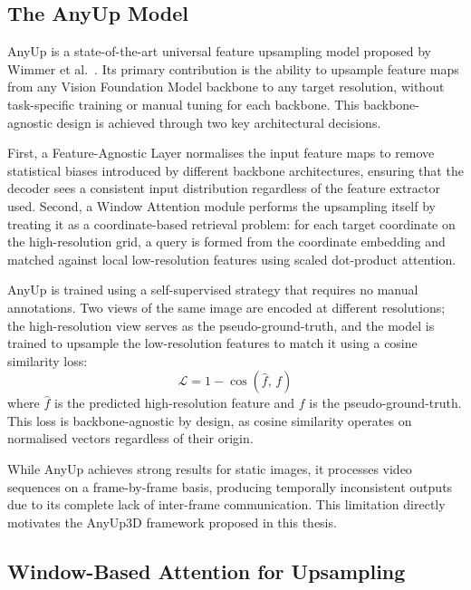 \subsection{The AnyUp Model}
\label{sec:anyup2d}

AnyUp is a state-of-the-art universal feature upsampling model
proposed by Wimmer et al.\ \cite{anyup}.
Its primary contribution is the ability to upsample feature maps
from any Vision Foundation Model backbone to any target
resolution, without task-specific training or manual tuning for
each backbone.
This backbone-agnostic design is achieved through two key
architectural decisions.

First, a Feature-Agnostic Layer normalises the input feature
maps to remove statistical biases introduced by different
backbone architectures, ensuring that the decoder sees a
consistent input distribution regardless of the feature
extractor used.
Second, a Window Attention module performs the upsampling itself
by treating it as a coordinate-based retrieval problem: for each
target coordinate on the high-resolution grid, a query is formed
from the coordinate embedding and matched against local
low-resolution features using scaled dot-product attention.

AnyUp is trained using a self-supervised strategy that requires
no manual annotations.
Two views of the same image are encoded at different
resolutions; the high-resolution view serves as the
pseudo-ground-truth, and the model is trained to upsample the
low-resolution features to match it using a cosine similarity
loss:
\begin{equation}
  \mathcal{L} = 1 - \cos(\hat{f},\, f)
  \label{eq:anyup_loss}
\end{equation}
where $\hat{f}$ is the predicted high-resolution feature and $f$
is the pseudo-ground-truth.
This loss is backbone-agnostic by design, as cosine similarity
operates on normalised vectors regardless of their origin.

While AnyUp achieves strong results for static images, it
processes video sequences on a frame-by-frame basis, producing
temporally inconsistent outputs due to its complete lack of
inter-frame communication.
This limitation directly motivates the AnyUp3D framework
proposed in this thesis.

\subsection{Window-Based Attention for Upsampling}


